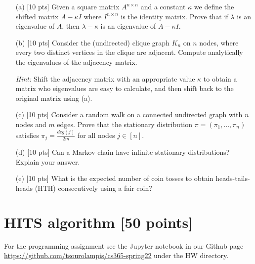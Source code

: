 \begin{enumerate}
	\item [(a)] [10 pts] Given a square matrix $A^{n \times n}$ and a constant $\kappa$ we define the shifted matrix $A-\kappa I$ where $I^{n \times n}$ is the identity matrix. Prove that if $\lambda$ is an eigenvalue of $A$, then $\lambda-\kappa$ is an eigenvalue of $A -\kappa I$. 
	
	\vspace{2mm} 
	\item[(b)]  [10 pts] Consider the (undirected) clique graph $K_n$ on $n$ nodes, where every two distinct vertices in the clique are adjacent.  Compute analytically the eigenvalues of the adjacency matrix. 	
	\vspace{2mm} 
	
	{\it Hint: }  Shift the adjacency matrix with an appropriate value $\kappa$ to obtain a matrix who eigenvalues are easy to calculate, and then shift back to the original matrix using (a).
	

	\item[(c)]  [10 pts]  Consider a random walk on a connected undirected graph with $n$ nodes and $m$ edges. Prove that the stationary distribution $\pi=(\pi_1,\ldots,\pi_n)$ satisfies
	$\pi_j = \frac{deg(j)}{2m}$ for all nodes $j \in [n]$. 
	
	
	\item[(d)]  [10 pts]   Can a Markov chain have infinite stationary distributions? Explain your answer.
	
		\item [(e) ]  [10 pts]
	What is the expected number of coin tosses to obtain heads-tails-heads (HTH) consecutively using a fair coin? \\ 


 

\end{enumerate}   

 

\section{HITS algorithm [50 points]}

For the programming assignment see the Jupyter notebook in our Github page \url{https://github.com/tsourolampis/cs365-spring22} under the HW directory.

 
 



